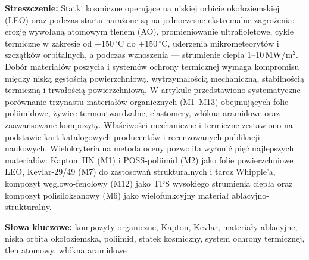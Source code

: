 \documentclass[11pt,a4paper]{article}
\begin{document}
\vspace{6pt}

\begingroup
  \setlength{\leftskip}{0.75cm}
  \setlength{\rightskip}{0.75cm}
  \fontsize{9}{10.8}\selectfont\noindent
  \textbf{Streszczenie:}
  Statki kosmiczne operujące na niskiej orbicie okołoziemskiej (LEO) oraz podczas
  startu narażone są na jednoczesne ekstremalne zagrożenia: erozję wywołaną
  atomowym tlenem (AO), promieniowanie ultrafioletowe, cykle termiczne w zakresie
  od $-150\,^{\circ}$C do $+150\,^{\circ}$C, uderzenia mikrometeorytów
  i szczątków orbitalnych, a podczas wznoszenia — strumienie ciepła
  1--10\,MW/m$^{2}$. Dobór materiałów poszycia i systemów ochrony termicznej
  wymaga kompromisu między niską gęstością powierzchniową, wytrzymałością
  mechaniczną, stabilnością termiczną i trwałością powierzchniową.
  W artykule przedstawiono systematyczne porównanie trzynastu materiałów
  organicznych (M1--M13) obejmujących folie poliimidowe, żywice termoutwardzalne,
  elastomery, włókna aramidowe oraz zaawansowane kompozyty. Właściwości
  mechaniczne i termiczne zestawiono na podstawie kart katalogowych producentów
  i recenzowanych publikacji naukowych. Wielokryterialna metoda oceny pozwoliła
  wyłonić pięć najlepszych materiałów: Kapton~HN (M1) i POSS-poliimid (M2) jako
  folie powierzchniowe LEO, Kevlar-29/49 (M7) do zastosowań strukturalnych
  i tarcz Whipple'a, kompozyt węglowo-fenolowy (M12) jako TPS wysokiego strumienia
  ciepła oraz kompozyt polisiloksanowy (M6) jako wielofunkcyjny materiał
  ablacyjno-strukturalny.
  \par\vspace{4pt}
  \noindent\textbf{Słowa kluczowe:}
  kompozyty organiczne, Kapton, Kevlar, materiały ablacyjne, niska orbita
  okołoziemska, poliimid, statek kosmiczny, system ochrony termicznej,
  tlen atomowy, włókna aramidowe
\endgroup
\end{document}
